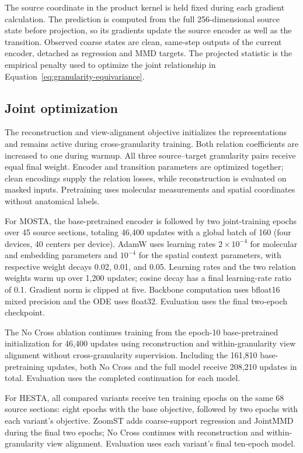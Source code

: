 The source coordinate in the product kernel is held fixed during each gradient calculation. The prediction is computed from the full 256-dimensional source state before projection, so its gradients update the source encoder as well as the transition. Observed coarse states are clean, same-step outputs of the current encoder, detached as regression and MMD targets. The projected statistic is the empirical penalty used to optimize the joint relationship in Equation~\ref{eq:granularity-equivariance}.

\subsection{Joint optimization}

The reconstruction and view-alignment objective initializes the representations and remains active during cross-granularity training. Both relation coefficients are increased to one during warmup. All three source--target granularity pairs receive equal final weight. Encoder and transition parameters are optimized together; clean encodings supply the relation losses, while reconstruction is evaluated on masked inputs. Pretraining uses molecular measurements and spatial coordinates without anatomical labels.


For MOSTA, the base-pretrained encoder is followed by two joint-training epochs over 45 source sections, totaling 46,400 updates with a global batch of 160 (four devices, 40 centers per device). AdamW uses learning rates $2\times 10^{-4}$ for molecular and embedding parameters and $10^{-4}$ for the spatial context parameters, with respective weight decays 0.02, 0.01, and 0.05. Learning rates and the two relation weights warm up over 1,200 updates; cosine decay has a final learning-rate ratio of 0.1. Gradient norm is clipped at five. Backbone computation uses bfloat16 mixed precision and the ODE uses float32. Evaluation uses the final two-epoch checkpoint.

The No Cross ablation continues training from the epoch-10 base-pretrained initialization for 46,400 updates using reconstruction and within-granularity view alignment without cross-granularity supervision. Including the 161,810 base-pretraining updates, both No Cross and the full model receive 208,210 updates in total. Evaluation uses the completed continuation for each model.

For HESTA, all compared variants receive ten training epochs on the same 68 source sections: eight epochs with the base objective, followed by two epochs with each variant's objective. ZoomST adds coarse-support regression and JointMMD during the final two epochs; No Cross continues with reconstruction and within-granularity view alignment. Evaluation uses each variant's final ten-epoch model.

